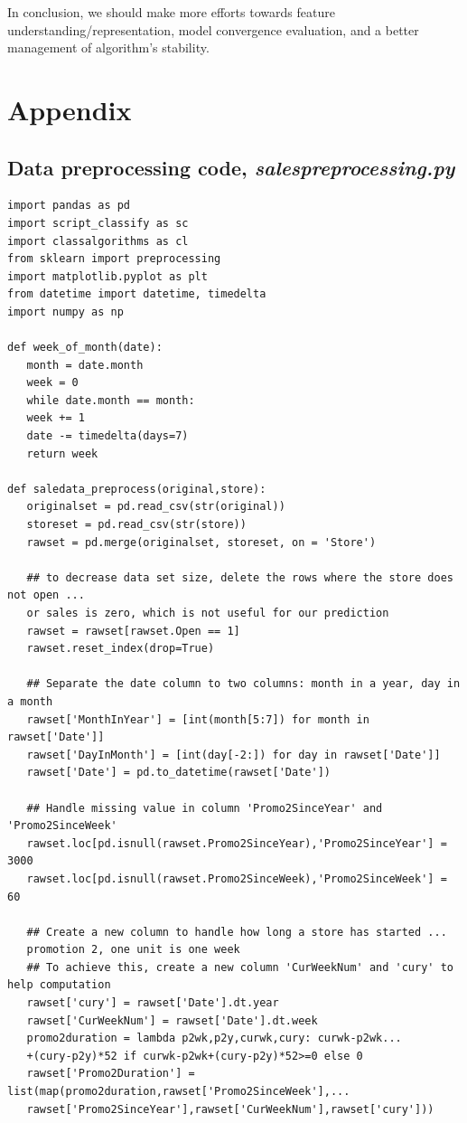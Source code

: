 \documentclass[11pt]{article}
\begin{document}
In conclusion, we should make more efforts towards feature understanding/representation, model convergence evaluation, and a better management of algorithm's stability.   

\section{Appendix}

\subsection{Data preprocessing code, \emph{salespreprocessing.py}}
\begin{verbatim}
import pandas as pd
import script_classify as sc
import classalgorithms as cl
from sklearn import preprocessing
import matplotlib.pyplot as plt
from datetime import datetime, timedelta
import numpy as np

def week_of_month(date):
   month = date.month
   week = 0
   while date.month == month:
   week += 1
   date -= timedelta(days=7)
   return week
   
def saledata_preprocess(original,store):
   originalset = pd.read_csv(str(original))
   storeset = pd.read_csv(str(store))
   rawset = pd.merge(originalset, storeset, on = 'Store')
   
   ## to decrease data set size, delete the rows where the store does not open ...
   or sales is zero, which is not useful for our prediction
   rawset = rawset[rawset.Open == 1]
   rawset.reset_index(drop=True)
   
   ## Separate the date column to two columns: month in a year, day in a month
   rawset['MonthInYear'] = [int(month[5:7]) for month in rawset['Date']]
   rawset['DayInMonth'] = [int(day[-2:]) for day in rawset['Date']]
   rawset['Date'] = pd.to_datetime(rawset['Date'])
   
   ## Handle missing value in column 'Promo2SinceYear' and 'Promo2SinceWeek'
   rawset.loc[pd.isnull(rawset.Promo2SinceYear),'Promo2SinceYear'] = 3000
   rawset.loc[pd.isnull(rawset.Promo2SinceWeek),'Promo2SinceWeek'] = 60
   
   ## Create a new column to handle how long a store has started ...
   promotion 2, one unit is one week
   ## To achieve this, create a new column 'CurWeekNum' and 'cury' to help computation
   rawset['cury'] = rawset['Date'].dt.year
   rawset['CurWeekNum'] = rawset['Date'].dt.week
   promo2duration = lambda p2wk,p2y,curwk,cury: curwk-p2wk...
   +(cury-p2y)*52 if curwk-p2wk+(cury-p2y)*52>=0 else 0
   rawset['Promo2Duration'] = list(map(promo2duration,rawset['Promo2SinceWeek'],...
   rawset['Promo2SinceYear'],rawset['CurWeekNum'],rawset['cury']))
   

\end{verbatim}
\end{document}
